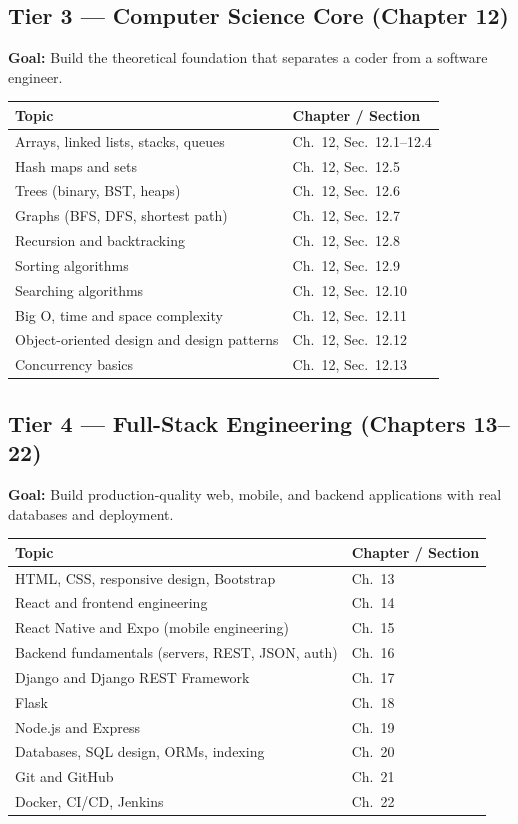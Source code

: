 \documentclass[12pt, a4paper, oneside]{book}
\begin{document}
\subsection{Tier 3 — Computer Science Core (Chapter 12)}

\textbf{Goal:} Build the theoretical foundation that separates a coder from a software engineer.

\begin{longtable}{p{} p{}}
\toprule
\textbf{Topic} & \textbf{Chapter / Section} \\
\midrule
\endhead
Arrays, linked lists, stacks, queues & Ch.\ 12, Sec.\ 12.1--12.4 \\
Hash maps and sets & Ch.\ 12, Sec.\ 12.5 \\
Trees (binary, BST, heaps) & Ch.\ 12, Sec.\ 12.6 \\
Graphs (BFS, DFS, shortest path) & Ch.\ 12, Sec.\ 12.7 \\
Recursion and backtracking & Ch.\ 12, Sec.\ 12.8 \\
Sorting algorithms & Ch.\ 12, Sec.\ 12.9 \\
Searching algorithms & Ch.\ 12, Sec.\ 12.10 \\
Big O, time and space complexity & Ch.\ 12, Sec.\ 12.11 \\
Object-oriented design and design patterns & Ch.\ 12, Sec.\ 12.12 \\
Concurrency basics & Ch.\ 12, Sec.\ 12.13 \\
\bottomrule
\end{longtable}

\subsection{Tier 4 — Full-Stack Engineering (Chapters 13--22)}

\textbf{Goal:} Build production-quality web, mobile, and backend applications with real databases and deployment.

\begin{longtable}{p{} p{}}
\toprule
\textbf{Topic} & \textbf{Chapter / Section} \\
\midrule
\endhead
HTML, CSS, responsive design, Bootstrap & Ch.\ 13 \\
React and frontend engineering & Ch.\ 14 \\
React Native and Expo (mobile engineering) & Ch.\ 15 \\
Backend fundamentals (servers, REST, JSON, auth) & Ch.\ 16 \\
Django and Django REST Framework & Ch.\ 17 \\
Flask & Ch.\ 18 \\
Node.js and Express & Ch.\ 19 \\
Databases, SQL design, ORMs, indexing & Ch.\ 20 \\
Git and GitHub & Ch.\ 21 \\
Docker, CI/CD, Jenkins & Ch.\ 22 \\
\bottomrule
\end{longtable}
\end{document}
